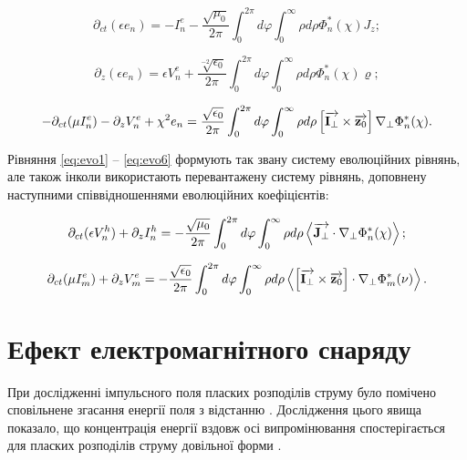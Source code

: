 \begin{equation} \label{eq:evo4}
\partial_{ct} (\epsilon e_n) = - I_n^e - 
\frac{\sqrt{\mu_0}}{2 \pi} \int_0^{2\pi} d \varphi 
\int_0^{\infty} \rho d \rho \Phi_n^* (\chi) J_z;
\end{equation}

\begin{equation} \label{eq:evo5}
\partial_{z} (\epsilon e_n) = \epsilon V_n^e + 
\frac{\sqrt[-2]{\epsilon_0}}{2 \pi} \int_0^{2\pi} d \varphi 
\int_0^{\infty} \rho d \rho \Phi_n^* (\chi) \varrho;
\end{equation}

\begin{equation} \label{eq:evo6}
- \partial_{ct}(\mu I_n^e) - \partial_z V_n^e + \chi^2 e_n = 
\frac{\sqrt{\epsilon_0}}{2 \pi} \int_0^{2\pi} d \varphi 
\int_0^{\infty} \rho d \rho \left[ \overrightarrow{\mathbf I_\perp} \times \overrightarrow{\mathbf z_0} \right]
\nabla_\perp \Phi_n^* (\chi).
\end{equation}

Рівняння \eqref{eq:evo1} -- \eqref{eq:evo6} формують так звану систему 
еволюційних рівнянь, але також інколи використають перевантажену систему 
рівнянь, доповнену наступними співвідношеннями еволюційних коефіцієнтів:

\begin{equation}
\partial_{ct} (\epsilon V_n^h) + \partial_z I_n^h = 
- \frac{\sqrt{\mu_0}}{2 \pi} \int_0^{2\pi} d \varphi 
\int_0^{\infty} \rho d \rho 
\left< \overrightarrow{\mathbf J_\perp} \cdot \nabla_\perp \Phi_n^* (\chi) \right>;
\end{equation}

\begin{equation}
\partial_{ct}(\mu I_m^e) + \partial_z V_m^e = - 
\frac{\sqrt{\epsilon_0}}{2 \pi} \int_0^{2\pi} d \varphi 
\int_0^{\infty} \rho d \rho 
\left< \left[ \overrightarrow{\mathbf I_\perp} \times \overrightarrow{\mathbf z_0} \right]  \cdot  \nabla_\perp \Phi_m^* (\nu)  \right>.
\end{equation}

\section{Ефект електромагнітного снаряду}

При дослідженні імпульсного поля пласких розподілів струму було 
помічено сповільнене згасання енергії поля з відстанню \cite{imp:Wu1989}. 
Дослідження цього явища показало, що концентрація енергії вздовж осі 
випромінювання спостерігається для пласких розподілів струму довільної форми 
\cite{imp:Wu1985}.

